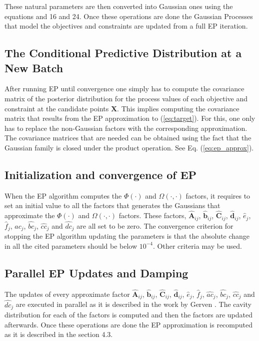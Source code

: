 These natural parameters are then converted into Gaussian ones using the equations and 16 and 24. Once these operations are done the Gaussian Processes that model the objectives and constraints are updated from a full EP iteration.


\subsection{The Conditional Predictive Distribution at a New Batch}

After running EP until convergence one simply has to compute the covariance matrix of the posterior distribution for the process values of each objective and constraint at the candidate points $\mathbf{X}$. This implies computing the covariance matrix that results from the EP approximation to (\ref{eq:target}).  For this, one only has to replace the non-Gaussian factors with the corresponding approximation. The covariance matrices that are needed can be obtained using the fact that the Gaussian family is closed under the product operation. See Eq. (\ref{eq:ep_approx}).

\subsection{Initialization and convergence of EP}

When the EP algorithm computes the $\Phi(\cdot)$ and $\Omega(\cdot,\cdot)$ factors, it requires to set an initial value to all the factors that generates the Gaussians that approximate the $\Phi(\cdot)$ and $\Omega(\cdot,\cdot)$ factors. These factors, $\hat{\boldsymbol{A}}_{ij}$, $\hat{\boldsymbol{b}}_{ij}$, $\hat{\boldsymbol{C}}_{ij}$, $\hat{\boldsymbol{d}}_{ij}$, $\hat{e}_{j}$, $\hat{f}_{j}$, $\hat{ac}_j$, $\hat{bc}_j$, $\hat{cc}_j$ and $\hat{dc}_j$ are all set to be zero. The convergence criterion for stopping the EP algorithm updating the parameters is that the absolute change in all the cited parameters should be below $10^{-4}$. Other criteria may be used.

\subsection{Parallel EP Updates and Damping}

The updates of every approximate factor $\hat{\boldsymbol{A}}_{ij}$, $\hat{\boldsymbol{b}}_{ij}$, $\hat{\boldsymbol{C}}_{ij}$, $\hat{\boldsymbol{d}}_{ij}$, $\hat{e}_{j}$, $\hat{f}_{j}$, $\hat{ac}_j$, $\hat{bc}_j$, $\hat{cc}_j$ and $\hat{dc}_j$ are executed in parallel as it is described in the work by Gerven \cite{gerven2009bayesian}. The cavity distribution for each of the factors is computed and then the factors are updated afterwards. Once these operations are done the EP approximation is recomputed as it is described in the section 4.3.

